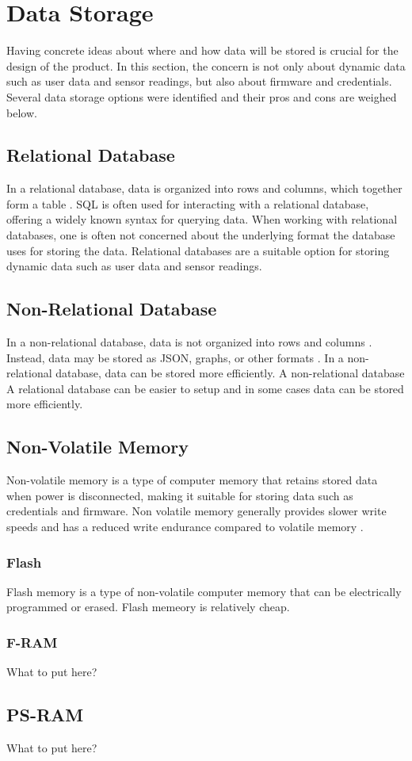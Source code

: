 \documentclass{article}
\begin{document}
\section{Data Storage}

Having concrete ideas about where and how data will be stored is crucial for the design of the product.
In this section, the concern is not only about dynamic data such as user data and sensor readings, but also about firmware and credentials.
Several data storage options were identified and their pros and cons are weighed below.

\subsection{Relational Database}

In a relational database, data is organized into rows and columns, which together form a table \cite{ibm-rd}.
SQL is often used for interacting with a relational database, offering a widely known syntax for querying data.
When working with relational databases, one is often not concerned about the underlying format the database uses for storing the data.
Relational databases are a suitable option for storing dynamic data such as user data and sensor readings.

\subsection{Non-Relational Database}

In a non-relational database, data is not organized into rows and columns \cite{microsoft-nrd}.
Instead, data may be stored as JSON, graphs, or other formats \cite{microsoft-nrd}.
In a non-relational database, data can be stored more efficiently.
A non-relational database 
A relational database can be easier to setup and in some cases data can be stored more efficiently.

\subsection{Non-Volatile Memory}

Non-volatile memory is a type of computer memory that retains stored data when power is disconnected, making it suitable for storing data such as credentials and firmware.
Non volatile memory generally provides slower write speeds and has a reduced write endurance compared to volatile memory \cite{cintra-2013}.

\subsubsection{Flash}

Flash memory is a type of non-volatile computer memory that can be electrically programmed or erased.
Flash memeory is relatively cheap.

\subsubsection{F-RAM}

What to put here?

\subsection{PS-RAM}

What to put here?

\clearpage



\end{document}
